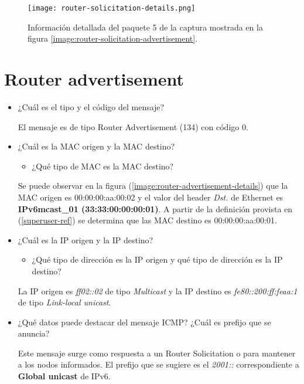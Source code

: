 \documentclass[osajnl,twocolumn,showpacs,superscriptaddress,10pt]{revtex4-1} %
\begin{document}
\begin{figure}[H]
    \centering
    \texttt{[image: router-solicitation-details.png]}
    \caption{Información detallada del paquete 5 de la captura mostrada en la figura \ref{image:router-solicitation-advertisement}.}
    \label{image:router-solicitation-details}
\end{figure}

\section{Router advertisement}

\begin{itemize}
    \item ¿Cuál es el tipo y el código del mensaje?
    
    El mensaje es de tipo Router Advertisement (134) con código 0.

    \item ¿Cuál es la MAC origen y la MAC destino?
    
    \begin{itemize}
        \item ¿Qué tipo de MAC es la MAC destino?
    \end{itemize}

    Se puede observar en la figura (\ref{image:router-advertisement-details}) que la MAC origen es 00:00:00:aa:00:02 y el valor del header \textit{Dst.} de Ethernet
    es \textbf{IPv6mcast\_01 (33:33:00:00:00:01)}. A partir de la definición provista en (\ref{superuser-ref}) se determina que
    las MAC destino es 00:00:00:aa:00:01.
    
    \item ¿Cuál es la IP origen y la IP destino?
    
    \begin{itemize}
        \item ¿Qué tipo de dirección es la IP origen y qué tipo de dirección es la IP destino?
    \end{itemize}
    
    La IP origen es \textit{ff02::02} de tipo \textit{Multicast} y la IP destino es \textit{fe80::200:ff:feaa:1} de tipo \textit{Link-local unicast}.

    \item ¿Qué datos puede destacar del mensaje ICMP? ¿Cuál es prefijo que se anuncia?
    
    Este mensaje surge como respuesta a un Router Solicitation o para mantener a los nodos informados. El prefijo
    que se sugiere es el \textit{2001::} correspondiente a \textbf{Global unicast} de IPv6.
\end{itemize}
\end{document}
